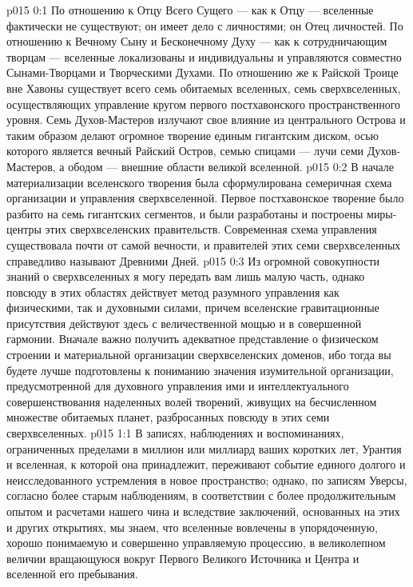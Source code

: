 \author{Вселенский Цензор}
\vs p015 0:1 По отношению к Отцу Всего Сущего --- как к Отцу --- вселенные фактически не существуют; он имеет дело с личностями; он Отец личностей. По отношению к Вечному Сыну и Бесконечному Духу --- как к сотрудничающим творцам --- вселенные локализованы и индивидуальны и управляются совместно Сынами\hyp{}Творцами и Творческими Духами. По отношению же к Райской Троице вне Хавоны существует всего семь обитаемых вселенных, семь сверхвселенных, осуществляющих управление кругом первого постхавонского пространственного уровня. Семь Духов\hyp{}Мастеров излучают свое влияние из центрального Острова и таким образом делают огромное творение единым гигантским диском, осью которого является вечный Райский Остров, семью спицами --- лучи семи Духов\hyp{}Мастеров, а ободом --- внешние области великой вселенной.
\vs p015 0:2 В начале материализации вселенского творения была сформулирована семеричная схема организации и управления сверхвселенной. Первое постхавонское творение было разбито на семь гигантских сегментов, и были разработаны и построены миры\hyp{}центры этих сверхвселенских правительств. Современная схема управления существовала почти от самой вечности, и правителей этих семи сверхвселенных справедливо называют Древними Дней.
\vs p015 0:3 Из огромной совокупности знаний о сверхвселенных я могу передать вам лишь малую часть, однако повсюду в этих областях действует метод разумного управления как физическими, так и духовными силами, причем вселенские гравитационные присутствия действуют здесь с величественной мощью и в совершенной гармонии. Вначале важно получить адекватное представление о физическом строении и материальной организации сверхвселенских доменов, ибо тогда вы будете лучше подготовлены к пониманию значения изумительной организации, предусмотренной для духовного управления ими и интеллектуального совершенствования наделенных волей творений, живущих на бесчисленном множестве обитаемых планет, разбросанных повсюду в этих семи сверхвселенных.
\vs p015 1:1 В записях, наблюдениях и воспоминаниях, ограниченных пределами в миллион или миллиард ваших коротких лет, Урантия и вселенная, к которой она принадлежит, переживают событие единого долгого и неисследованного устремления в новое пространство; однако, по записям Уверсы, согласно более старым наблюдениям, в соответствии с более продолжительным опытом и расчетами нашего чина и вследствие заключений, основанных на этих и других открытиях, мы знаем, что вселенные вовлечены в упорядоченную, хорошо понимаемую и совершенно управляемую процессию, в великолепном величии вращающуюся вокруг Первого Великого Источника и Центра и вселенной его пребывания.
